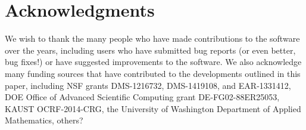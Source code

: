 %
%


\section*{Acknowledgments} 

We wish to thank the many people who have made contributions to the 
\clawpack software over the years, including users who have submitted bug
reports (or even better, bug fixes!) or have suggested
improvements to the software.  We also acknowledge many funding sources that
have contributed to the developments outlined in this paper, including
NSF grants DMS-1216732, DMS-1419108, and EAR-1331412,
DOE Office of Advanced Scientific Computing grant DE-FG02-88ER25053,
KAUST OCRF-2014-CRG,
the University of Washington Department of Applied Mathematics,
\alert{others?}


